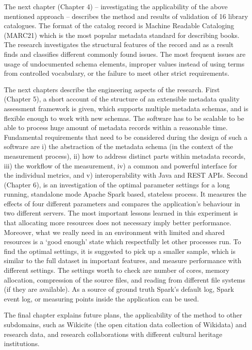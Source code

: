 The next chapter (Chapter 4) -- investigating the applicability of the above mentioned approach -- describes the method and results of validation of 16 library catalogues. The format of the catalog record is Machine Readable Cataloging (MARC21) which is the most popular metadata standard for describing books. The research investigates the structural features of the record and as a result finds and classifies different commonly found issues. The most frequent issues are usage of undocumented schema elements, improper values instead of using terms from controlled vocabulary, or the failure to meet other strict requirements.

The next chapters describe the engineering aspects of the research. First (Chapter 5), a short account of the structure of an extensible metadata quality assessment framework is given, which supports multiple metadata schemas, and is flexible enough to work with new schemas. The software has to be scalable to be able to process huge amount of metadata records within a reasonable time. Fundamental requirements that need to be considered during the design of such a software are i) the abstraction of the metadata schema (in the context of the measurement process), ii) how to address distinct parts within metadata records, iii) the workflow of the measurement, iv) a common and powerful interface for the individual metrics, and v) interoperability with Java and REST APIs. Second (Chapter 6), is an investigation of the optimal parameter settings for a long running, standalone mode Apache Spark based, stateless process. It measures the effects of four different parameters and compares the application's behaviour in two different servers. The most important lessons learned in this experiment is that allocating more resources does not necessary imply better performance. Moreover, what we really need in an environment with limited and shared resources is a ‘good enough' state which respectfully let other processes run. To find the optimal settings, it is suggested to pick up a smaller sample, which is similar to the full dataset in important features, and measure performance with different settings. The settings worth to check are number of cores, memory allocation, compression of the source files, and reading from different file systems (if they are available). As a source of ground truth Spark's default log, Spark event log, or measuring points inside the application can be used.

The final chapter explains future plans, the applicability of the method to other subdomains, such as Wikicite (the open citation data collection of Wikidata) and research data, and research collaborations with different cultural heritage institutions.

